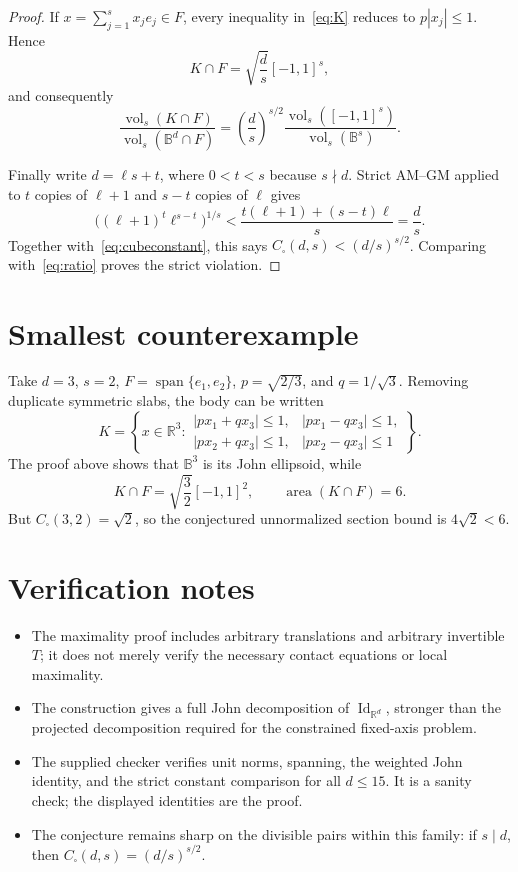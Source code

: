 \documentclass[11pt]{article}
\newcommand{\R}{\mathbb R}
\newcommand{\B}{\mathbb B}
\newcommand{\vol}{\operatorname{vol}}
\newcommand{\Id}{\operatorname{Id}}
\newcommand{\Span}{\operatorname{span}}
\begin{document}
\begin{proof}
If \(x=\sum_{j=1}^s x_j e_j\in F\), every inequality in~\eqref{eq:K}
reduces to \(p|x_j|\leq1\).  Hence
\[
 K\cap F=\sqrt{\frac{d}{s}}[-1,1]^s,
\]
and consequently
\begin{equation}\label{eq:ratio}
 \frac{\vol_s(K\cap F)}{\vol_s(\B^d\cap F)}
 =\left(\frac{d}{s}\right)^{s/2}
  \frac{\vol_s([-1,1]^s)}{\vol_s(\B^s)}.
\end{equation}

Finally write \(d=\ell s+t\), where \(0<t<s\) because \(s\nmid d\).
Strict AM--GM applied to \(t\) copies of \(\ell+1\) and \(s-t\) copies of
\(\ell\) gives
\[
 \bigl((\ell+1)^t\ell^{s-t}\bigr)^{1/s}
 <\frac{t(\ell+1)+(s-t)\ell}{s}
 =\frac{d}{s}.
\]
Together with~\eqref{eq:cubeconstant}, this says
\(C_{\square}(d,s)<(d/s)^{s/2}\).  Comparing with~\eqref{eq:ratio}
proves the strict violation.
\end{proof}

\section*{Smallest counterexample}

Take \(d=3\), \(s=2\), \(F=\Span\{e_1,e_2\}\),
\(p=\sqrt{2/3}\), and \(q=1/\sqrt3\).  Removing duplicate symmetric slabs,
the body can be written
\[
 K=\left\{x\in\R^3:
 \begin{array}{ll}
 |p x_1+q x_3|\leq1,&|p x_1-q x_3|\leq1,\\
 |p x_2+q x_3|\leq1,&|p x_2-q x_3|\leq1
 \end{array}\right\}.
\]
The proof above shows that \(\B^3\) is its John ellipsoid, while
\[
 K\cap F=\sqrt{\frac32}[-1,1]^2,
 \qquad \operatorname{area}(K\cap F)=6.
\]
But \(C_{\square}(3,2)=\sqrt2\), so the conjectured unnormalized section
bound is \(4\sqrt2<6\).

\section*{Verification notes}

\begin{itemize}
\item The maximality proof includes arbitrary translations and arbitrary
      invertible \(T\); it does not merely verify the necessary contact
      equations or local maximality.
\item The construction gives a full John decomposition of \(\Id_{\R^d}\),
      stronger than the projected decomposition required for the constrained
      fixed-axis problem.
\item The supplied checker verifies unit norms, spanning, the weighted John
      identity, and the strict constant comparison for all \(d\leq15\).  It
      is a sanity check; the displayed identities are the proof.
\item The conjecture remains sharp on the divisible pairs within this family:
      if \(s\mid d\), then \(C_{\square}(d,s)=(d/s)^{s/2}\).
\end{itemize}
\end{document}
